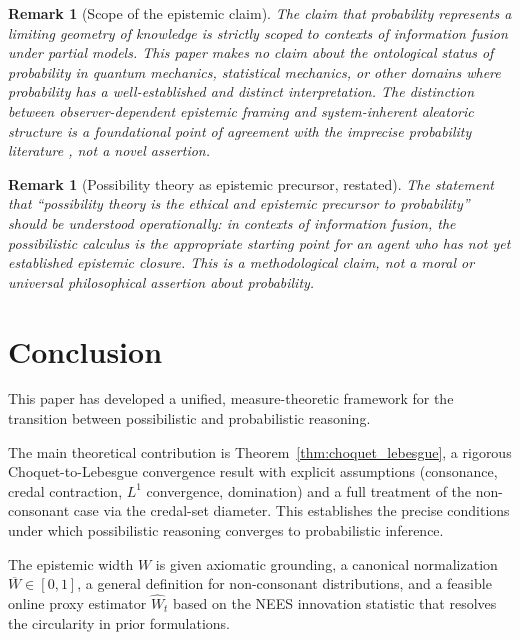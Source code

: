 \documentclass[12pt]{article}
\newtheorem{remark}[theorem]{Remark}
\newcommand{\Lone}{L^1}
\begin{document}
\begin{remark}[Scope of the epistemic claim]
The claim that probability represents a limiting geometry of knowledge is
strictly scoped to contexts of information fusion under partial models.
This paper makes no claim about the ontological status of probability in
quantum mechanics, statistical mechanics, or other domains where probability
has a well-established and distinct interpretation.
The distinction between observer-dependent epistemic framing and
system-inherent aleatoric structure is a foundational point of agreement with
the imprecise probability literature \cite{walley1991,augustin2014},
not a novel assertion.
\end{remark}

\begin{remark}[Possibility theory as epistemic precursor, restated]
The statement that ``possibility theory is the ethical and epistemic precursor
to probability'' should be understood operationally: in contexts of information
fusion, the possibilistic calculus is the \emph{appropriate} starting point
for an agent who has not yet established epistemic closure.
This is a methodological claim, not a moral or universal philosophical
assertion about probability.
\end{remark}

\section{Conclusion}
\label{sec:conclusion}

This paper has developed a unified, measure-theoretic framework for the
transition between possibilistic and probabilistic reasoning.

The main theoretical contribution is Theorem~\ref{thm:choquet_lebesgue},
a rigorous Choquet-to-Lebesgue convergence result with explicit assumptions
(consonance, credal contraction, $\Lone$ convergence, domination)
and a full treatment of the non-consonant case via the credal-set diameter.
This establishes the precise conditions under which possibilistic reasoning
converges to probabilistic inference.

The epistemic width $W$ is given axiomatic grounding, a canonical normalization
$\overline{W}\in[0,1]$, a general definition for non-consonant distributions,
and a feasible online proxy estimator $\widehat{W}_t$ based on the NEES
innovation statistic that resolves the circularity in prior formulations.
\end{document}
